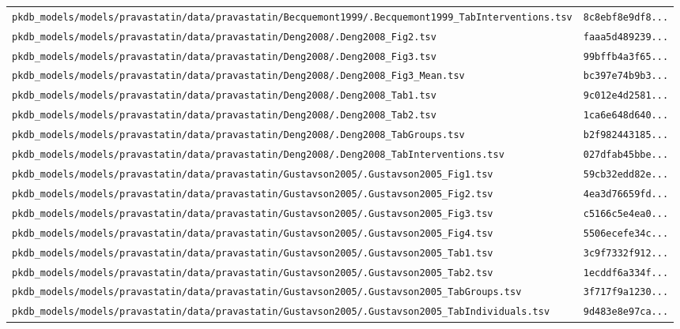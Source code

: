 \begin{longtable}{ll}
\texttt{pkdb\_models/models/pravastatin/data/pravastatin/Becquemont1999/.Becquemont1999\_TabInterventions.tsv} & \texttt{8c8ebf8e9df8...} \\
\texttt{pkdb\_models/models/pravastatin/data/pravastatin/Deng2008/.Deng2008\_Fig2.tsv} & \texttt{faaa5d489239...} \\
\texttt{pkdb\_models/models/pravastatin/data/pravastatin/Deng2008/.Deng2008\_Fig3.tsv} & \texttt{99bffb4a3f65...} \\
\texttt{pkdb\_models/models/pravastatin/data/pravastatin/Deng2008/.Deng2008\_Fig3\_Mean.tsv} & \texttt{bc397e74b9b3...} \\
\texttt{pkdb\_models/models/pravastatin/data/pravastatin/Deng2008/.Deng2008\_Tab1.tsv} & \texttt{9c012e4d2581...} \\
\texttt{pkdb\_models/models/pravastatin/data/pravastatin/Deng2008/.Deng2008\_Tab2.tsv} & \texttt{1ca6e648d640...} \\
\texttt{pkdb\_models/models/pravastatin/data/pravastatin/Deng2008/.Deng2008\_TabGroups.tsv} & \texttt{b2f982443185...} \\
\texttt{pkdb\_models/models/pravastatin/data/pravastatin/Deng2008/.Deng2008\_TabInterventions.tsv} & \texttt{027dfab45bbe...} \\
\texttt{pkdb\_models/models/pravastatin/data/pravastatin/Gustavson2005/.Gustavson2005\_Fig1.tsv} & \texttt{59cb32edd82e...} \\
\texttt{pkdb\_models/models/pravastatin/data/pravastatin/Gustavson2005/.Gustavson2005\_Fig2.tsv} & \texttt{4ea3d76659fd...} \\
\texttt{pkdb\_models/models/pravastatin/data/pravastatin/Gustavson2005/.Gustavson2005\_Fig3.tsv} & \texttt{c5166c5e4ea0...} \\
\texttt{pkdb\_models/models/pravastatin/data/pravastatin/Gustavson2005/.Gustavson2005\_Fig4.tsv} & \texttt{5506ecefe34c...} \\
\texttt{pkdb\_models/models/pravastatin/data/pravastatin/Gustavson2005/.Gustavson2005\_Tab1.tsv} & \texttt{3c9f7332f912...} \\
\texttt{pkdb\_models/models/pravastatin/data/pravastatin/Gustavson2005/.Gustavson2005\_Tab2.tsv} & \texttt{1ecddf6a334f...} \\
\texttt{pkdb\_models/models/pravastatin/data/pravastatin/Gustavson2005/.Gustavson2005\_TabGroups.tsv} & \texttt{3f717f9a1230...} \\
\texttt{pkdb\_models/models/pravastatin/data/pravastatin/Gustavson2005/.Gustavson2005\_TabIndividuals.tsv} & \texttt{9d483e8e97ca...} \\

\end{longtable}
